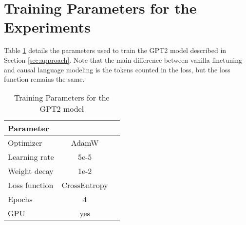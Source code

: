 \section{Training Parameters for the Experiments}

Table \ref{tbl:Params} details the parameters used to train the GPT2 model described in Section \ref{sec:approach}. Note that the main difference between vanilla finetuning and causal language modeling is the tokens counted in the loss, but the loss function remains the same.

\begin{table}[h]
\begin{center} 
\begin{tabular}{lcc}  
	\toprule  %
	 Parameter &  \\
	\midrule 
     Optimizer & AdamW  \\ 
     Learning rate & 5e-5\\ 
     Weight decay & 1e-2\\ 
     Loss function & CrossEntropy \\
     Epochs & 4 \\
     GPU & yes \\
\end{tabular}
\caption{\label{tbl:Params} Training Parameters for the GPT2 model}
\end{center}
\end{table}
